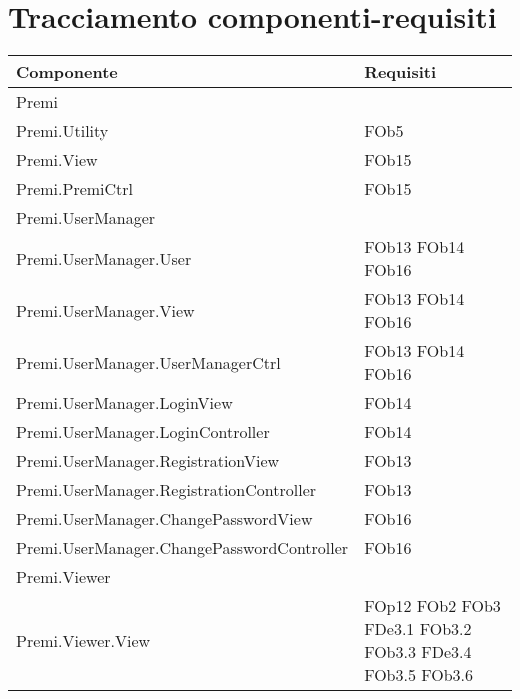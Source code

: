 \newpage
\section{Tracciamento componenti-requisiti}	
\begin{longtable}{|p{10cm}|p{4cm}|}
\hline
\textbf{Componente}  & \textbf{Requisiti} \\
\hline
Premi & \\
\hline
Premi.Utility & FOb5 \linebreak \\
\hline
Premi.View & FOb15 \linebreak \\
\hline
Premi.PremiCtrl & FOb15 \linebreak \\
\hline
Premi.UserManager & \\
\hline
Premi.UserManager.User & FOb13 \linebreak FOb14 \linebreak FOb16 \linebreak \\
\hline
Premi.UserManager.View & FOb13 \linebreak FOb14 \linebreak FOb16 \linebreak \\
\hline
Premi.UserManager.UserManagerCtrl & FOb13 \linebreak FOb14 \linebreak FOb16 \linebreak \\
\hline
Premi.UserManager.LoginView & FOb14 \linebreak \\
\hline
Premi.UserManager.LoginController & FOb14 \linebreak \\
\hline
Premi.UserManager.RegistrationView & FOb13 \linebreak \\
\hline
Premi.UserManager.RegistrationController & FOb13 \linebreak \\
\hline
Premi.UserManager.ChangePasswordView & FOb16 \linebreak \\
\hline
Premi.UserManager.ChangePasswordController & FOb16 \linebreak \\
\hline
Premi.Viewer & \\
\hline
Premi.Viewer.View & FOp12 \linebreak FOb2 \linebreak FOb3 \linebreak FDe3.1 \linebreak FOb3.2 \linebreak FOb3.3 \linebreak FDe3.4 \linebreak FOb3.5 \linebreak FOb3.6 \linebreak \\

\end{longtable}
